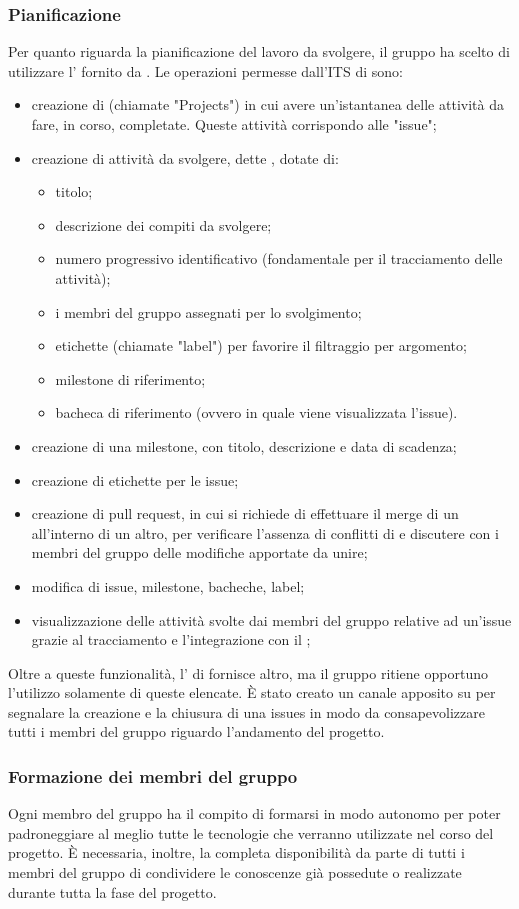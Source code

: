 \subsubsection{Pianificazione}
Per quanto riguarda la pianificazione del lavoro da svolgere, il gruppo \Gruppo{} ha scelto di utilizzare l' fornito da .
Le operazioni permesse dall'ITS di  sono:
\begin{itemize}
	\item creazione di  (chiamate "Projects") in cui avere un'istantanea delle attività da fare, in corso, completate. Queste attività corrispondo alle "issue";
	\item creazione di attività da svolgere, dette , dotate di:
	\begin{itemize}
		\item titolo;
		\item descrizione dei compiti da svolgere;
		\item numero progressivo identificativo (fondamentale per il tracciamento delle attività);
		\item i membri del gruppo assegnati per lo svolgimento;
		\item etichette (chiamate "label") per favorire il filtraggio per argomento;
		\item milestone di riferimento;
		\item bacheca di riferimento (ovvero in quale  viene visualizzata l'issue).
	\end{itemize}
	\item creazione di una milestone, con titolo, descrizione e data di scadenza;
	\item creazione di etichette per le issue;
	\item creazione di pull request, in cui si richiede di effettuare il merge di un  all'interno di un altro, per verificare l'assenza di conflitti di  e discutere con i membri del gruppo delle modifiche apportate da unire;
	\item modifica di issue, milestone, bacheche, label;
	\item visualizzazione delle attività svolte dai membri del gruppo relative ad un'issue grazie al tracciamento e l'integrazione con il  ;
\end{itemize}
Oltre a queste funzionalità, l' di  fornisce altro, ma il gruppo \Gruppo{} ritiene opportuno l'utilizzo solamente di queste elencate.
È stato creato un canale apposito su  per segnalare la creazione e la chiusura di una issues in modo da consapevolizzare tutti i membri del gruppo riguardo l'andamento del progetto.

\subsubsection{Formazione dei membri del gruppo}
Ogni membro del gruppo ha il compito di formarsi in modo autonomo per poter padroneggiare al meglio tutte le tecnologie che verranno utilizzate nel corso del progetto.
È necessaria, inoltre, la completa disponibilità da parte di tutti i membri del gruppo di condividere le conoscenze già possedute o realizzate durante tutta la fase del progetto.